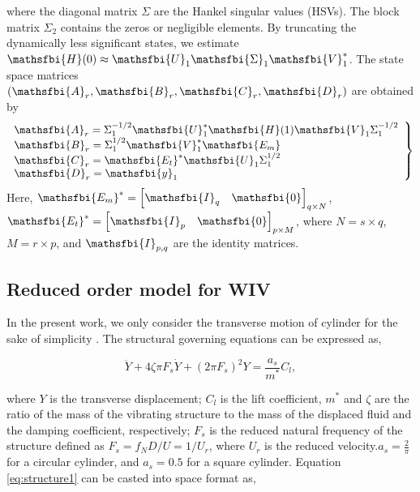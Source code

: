 where the diagonal matrix $\Sigma$ are the Hankel singular values (HSVs). 
The block matrix $\Sigma_2$ contains the zeros or 
negligible elements. By truncating the dynamically less significant states, we estimate 
$\mathsfbi{H}(0) \approx \mathsfbi{U}_1\mathsfbi{\Sigma}_1\mathsfbi{V}_1^*$. 
The state space matrices $(\mathsfbi{A}_{r}, \mathsfbi{B}_{r}, \mathsfbi{C}_{r}, \mathsfbi{D}_{r})$ are obtained by
\begin{equation}
\left. \begin{array}{ll}

\displaystyle \mathsfbi{A}_{r}=\Sigma^{-1/2}_{1}\mathsfbi{U}^{*}_{1}\mathsfbi{H}(1)\mathsfbi{V}_{1}\Sigma^{-1/2}_{1} \\
\displaystyle \mathsfbi{B}_{r}=\Sigma^{1/2}_{1}\mathsfbi{V}^{*}_{1}\mathsfbi{E_m}   \\
\displaystyle \mathsfbi{C}_{r}=\mathsfbi{E_t}^{*}\mathsfbi{U}_{1}\Sigma^{1/2}_{1}   \\    
\displaystyle \mathsfbi{D}_{r}=\mathsfbi{y}_{1}
\end{array}\right\}
 \label{eq:ERA_ROM_matrices}
\end{equation}  
Here, $\mathsfbi{E_m}^*=\left[\mathsfbi{I}_q \quad \mathsfbi{0} \right]_{q\times N}$, 
$\mathsfbi{E_t}^{*}=\left[\mathsfbi{I}_p \quad \mathsfbi{0} \right]_{p \times M}$, where
$N =s \times q$, $M =r \times p$, and $\mathsfbi{I}_{p,q}$ are the identity matrices. 



\subsection{Reduced order model for WIV}

In the present work, we only consider the transverse motion of cylinder for the sake of simplicity \cite{yao_jfm_1}.
The structural governing equations can be expressed as,
 
\begin{equation}
{\ddot{Y} + 4\zeta\pi F_{s}\dot{Y} + (2\pi F_{s})^2 Y}=\frac{a_{s}}{m^{*}} C_{l},
\label{eq:structure1}
\end{equation}

where $Y$ is the transverse displacement; $C_{l}$ is the lift coefficient, 
$m^{*}$ and $\zeta$ are the ratio of the mass of the vibrating structure to the mass of the displaced fluid and the 
damping coefficient, respectively; $F_{s}$ is the reduced natural frequency of the structure 
defined as $F_{s}=f_{N}D/U = 1/U_r$, where $U_r$ is the reduced velocity.$a_{s}=\frac{2}{\pi}$ for a circular cylinder, 
and  $a_{s}=0.5$ for a square cylinder.
Equation \eqref{eq:structure1} can be casted into space format as, 

